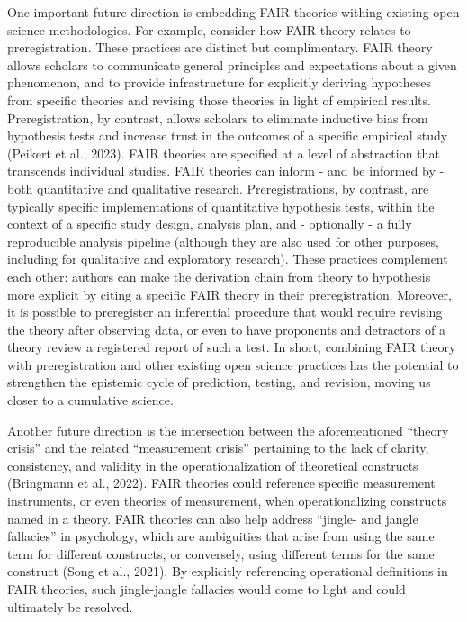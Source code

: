 \documentclass[man]{apa7}
\begin{document}
\label{fairtheoryprereg}{One important future direction is embedding FAIR theories withing existing open science methodologies.
For example, consider how FAIR theory relates to preregistration.
These practices are distinct but complimentary.
FAIR theory allows scholars to communicate general principles and expectations about a given phenomenon,
and to provide infrastructure for explicitly deriving hypotheses from specific theories and revising those theories in light of empirical results.
Preregistration, by contrast, allows scholars to eliminate inductive bias from hypothesis tests and increase trust in the outcomes of a specific empirical study (Peikert et al., 2023).
FAIR theories are specified at a level of abstraction that transcends individual studies.
FAIR theories can inform - and be informed by - both quantitative and qualitative research.
Preregistrations, by contrast, are typically specific implementations of quantitative hypothesis tests,
within the context of a specific study design, analysis plan, and - optionally - a fully reproducible analysis pipeline (although they are also used for other purposes, including for qualitative and exploratory research).
These practices complement each other:
authors can make the derivation chain from theory to hypothesis more explicit by citing a specific FAIR theory in their preregistration.
Moreover, it is possible to preregister an inferential procedure that would require revising the theory after observing data,
or even to have proponents and detractors of a theory review a registered report of such a test.
In short, combining FAIR theory with preregistration and other existing open science practices has the potential to strengthen the epistemic cycle of prediction, testing, and revision, moving us closer to a cumulative science.}

\label{measurementcrisis}{Another future direction is the intersection between the aforementioned ``theory crisis'' and the related ``measurement crisis'' pertaining to the lack of clarity, consistency, and validity in the operationalization of theoretical constructs (Bringmann et al., 2022).
FAIR theories could reference specific measurement instruments, or even theories of measurement,
when operationalizing constructs named in a theory.}
\label{jinglejangle}{FAIR theories can also help address ``jingle- and jangle fallacies'' in psychology,
which are ambiguities that arise from using the same term for different constructs, or conversely, using different terms for the same construct (Song et al., 2021).
By explicitly referencing operational definitions in FAIR theories,
such jingle-jangle fallacies would come to light and could ultimately be resolved.}
\end{document}
